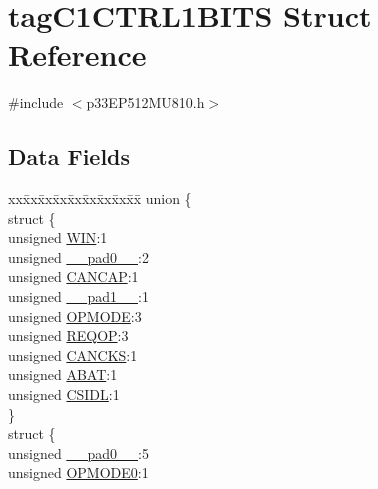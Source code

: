 \hypertarget{structtag_c1_c_t_r_l1_b_i_t_s}{}\section{tag\+C1\+C\+T\+R\+L1\+B\+I\+TS Struct Reference}
\label{structtag_c1_c_t_r_l1_b_i_t_s}


{\ttfamily \#include $<$p33\+E\+P512\+M\+U810.\+h$>$}

\subsection*{Data Fields}
\begin{DoxyCompactItemize}
\item 
\begin{tabbing}
xx\=xx\=xx\=xx\=xx\=xx\=xx\=xx\=xx\=\kill
union \{\\
\>struct \{\\
\>\>unsigned \hyperlink{structtag_c1_c_t_r_l1_b_i_t_s_a90ca5ea17e8ea3beddc52942ba75c12d}{WIN}:1\\
\>\>unsigned \hyperlink{structtag_c1_c_t_r_l1_b_i_t_s_adf71f3d8410c1f1dbbc96680a92c49af}{\_\_pad0\_\_}:2\\
\>\>unsigned \hyperlink{structtag_c1_c_t_r_l1_b_i_t_s_a182da075d6e0a4ea562f849257f8c59e}{CANCAP}:1\\
\>\>unsigned \hyperlink{structtag_c1_c_t_r_l1_b_i_t_s_acaf2d0924a107ec6e8d2e31febaf66f9}{\_\_pad1\_\_}:1\\
\>\>unsigned \hyperlink{structtag_c1_c_t_r_l1_b_i_t_s_a01820f5081ba61cb9040ff44a67123cb}{OPMODE}:3\\
\>\>unsigned \hyperlink{structtag_c1_c_t_r_l1_b_i_t_s_a9908d34ca9c08b8946fd439ec9bd721a}{REQOP}:3\\
\>\>unsigned \hyperlink{structtag_c1_c_t_r_l1_b_i_t_s_a199db3a19f3c099225f38873670dd419}{CANCKS}:1\\
\>\>unsigned \hyperlink{structtag_c1_c_t_r_l1_b_i_t_s_af05a9e268e5f829b3159a367753d461b}{ABAT}:1\\
\>\>unsigned \hyperlink{structtag_c1_c_t_r_l1_b_i_t_s_a2180358be897944fe29e49fe5d608d70}{CSIDL}:1\\
\>\} \\
\>struct \{\\
\>\>unsigned \hyperlink{structtag_c1_c_t_r_l1_b_i_t_s_adf71f3d8410c1f1dbbc96680a92c49af}{\_\_pad0\_\_}:5\\
\>\>unsigned \hyperlink{structtag_c1_c_t_r_l1_b_i_t_s_a02b918d80a43676231c88e99e8a2ea26}{OPMODE0}:1\\

\end{tabbing}
\end{DoxyCompactItemize}
